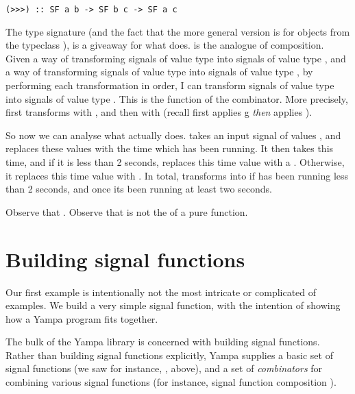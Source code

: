 \begin{lstlisting}
(>>>) :: SF a b -> SF b c -> SF a c
\end{lstlisting}

\noindent The type signature (and the fact that the more general version is for objects from the typeclass ), is a giveaway for what \hask{(>>>)} does. \hask{(>>>)} is the  analogue of composition. Given a way of transforming signals of value type  into signals of value type , and a way of transforming signals of value type  into signals of value type , by performing each transformation in order, I can transform signals of value type  into signals of value type . This is the function of the \hask{(>>>)} combinator. More precisely,  first transforms with , and then with  (recall  first applies g \emph{then} applies ).

So now we can analyse what  actually does.  takes an input signal of values \hask{()}, and replaces these values with the time which \yampaMain has been running. It then takes this time, and if it is less than 2 seconds, replaces this time value with a . Otherwise, it replaces this time value with . In total,  transforms \hask{()} into  if \yampaMain has been running less than 2 seconds, and  once its been running at least two seconds.

\begin{observation}
Observe that . Observe that  is not the  of a pure function.
\end{observation}

\section{Building signal functions}

Our first example is intentionally not the most intricate or complicated of examples. We build a very simple signal function, with the intention of showing how a Yampa program fits together.

The bulk of the Yampa library is concerned with building signal functions. Rather than building signal functions explicitly, Yampa supplies a basic set of signal functions (we saw for instance, , above), and a set of \emph{combinators} for combining various signal functions (for instance, signal function composition \hask{>>>}).

